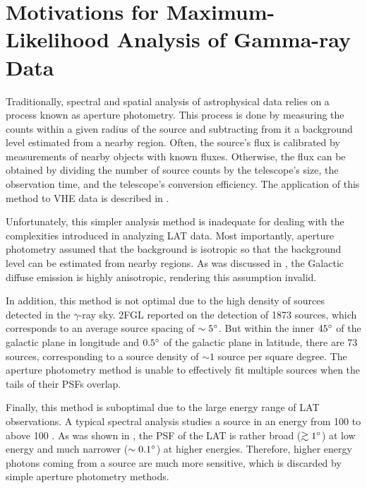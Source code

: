 \section{Motivations for Maximum-Likelihood Analysis of Gamma-ray Data}

Traditionally, spectral and spatial analysis of astrophysical data
relies on a process known as aperture photometry.  This process is
done by measuring the counts within a given radius of the source and
subtracting from it a background level estimated from a nearby region.
Often, the source's flux is calibrated by measurements of nearby objects
with known fluxes.  Otherwise, the flux can be obtained by dividing the
number of source counts by the telescope's size, the observation time,
and the telescope's conversion efficiency.  The application of this
method to \ac{VHE} data is described in \cite{li_1983_analysis-methods}.

Unfortunately, this simpler analysis method is inadequate for dealing with
the complexities introduced in analyzing LAT data.  Most importantly,
aperture photometry assumed that the background is isotropic so that
the background level can be estimated from nearby regions.  As was
discussed in , the Galactic
diffuse emission is highly anisotropic, rendering this assumption invalid.

In addition, this method is not optimal due to the high density of sources
detected in the $\gamma$-ray sky.  \Ac{2FGL} reported on the detection
of 1873 sources, which corresponds to an average source spacing of
$\sim5^\circ$.  But within the inner $45^\circ$ of the galactic plane
in longitude and $0.5^\circ$ of the galactic plane in latitude, there
are 73 sources, corresponding to a source density of $\sim 1$ source per
square degree.  The aperture photometry method is unable to effectively
fit multiple sources when the tails of their \acp{PSF} overlap.

Finally, this method is suboptimal due to the large energy range of
\ac{LAT} observations.  A typical spectral analysis studies a source in an
energy from 100 \mev to above 100 \gev.  As was shown
in , the \ac{PSF} of the \ac{LAT} is rather broad ($\gtrsim
1^\circ$) at low energy and much narrower ($\sim 0.1^\circ$) at higher
energies. Therefore, higher 
energy photons coming from a source are much more sensitive, which
is discarded by simple aperture photometry methods.

